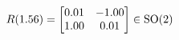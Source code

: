 \documentclass[preview]{standalone}
\begin{document}
\begin{align*}
\special{dvisvgm:raw <g id='unique000'>}R(1.56) = \begin{bmatrix} 0.01 & -1.00 \\ 1.00 & 0.01 \end{bmatrix} \in \text{SO}(2)\special{dvisvgm:raw </g>}
\end{align*}
\end{document}
